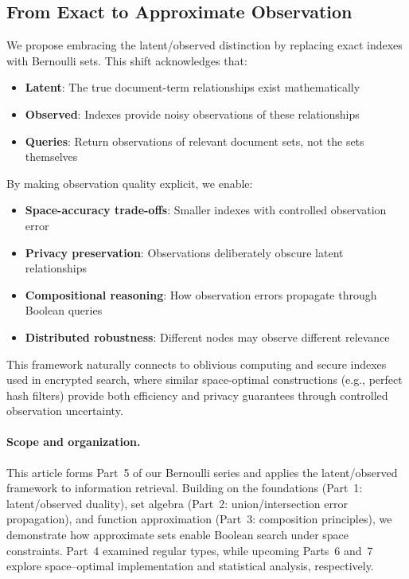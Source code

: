 \documentclass[11pt,final,hidelinks]{article}
\begin{document}
\subsection{From Exact to Approximate Observation}

We propose embracing the latent/observed distinction by replacing exact indexes with Bernoulli sets. This shift acknowledges that:
\begin{itemize}
    \item \textbf{Latent}: The true document-term relationships exist mathematically
    \item \textbf{Observed}: Indexes provide noisy observations of these relationships
    \item \textbf{Queries}: Return observations of relevant document sets, not the sets themselves
\end{itemize}

By making observation quality explicit, we enable:
\begin{itemize}
    \item \textbf{Space-accuracy trade-offs}: Smaller indexes with controlled observation error
    \item \textbf{Privacy preservation}: Observations deliberately obscure latent relationships  
    \item \textbf{Compositional reasoning}: How observation errors propagate through Boolean queries
    \item \textbf{Distributed robustness}: Different nodes may observe different relevance
\end{itemize}

This framework naturally connects to oblivious computing and secure indexes used in encrypted search, where similar space-optimal constructions (e.g., perfect hash filters) provide both efficiency and privacy guarantees through controlled observation uncertainty.

\paragraph{Scope and organization.}  This article forms Part~5 of our Bernoulli series and applies the latent/observed framework to information retrieval.  Building on the foundations (Part~1: latent/observed duality), set algebra (Part~2: union/intersection error propagation), and function approximation (Part~3: composition principles), we demonstrate how approximate sets enable Boolean search under space constraints.  Part~4 examined regular types, while upcoming Parts~6 and~7 explore space–optimal implementation and statistical analysis, respectively.
\end{document}

